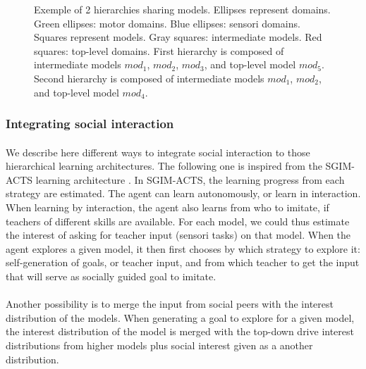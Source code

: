 \documentclass[12pt]{article}
\begin{document}
\begin{figure}[H]

				\caption{Exemple of 2 hierarchies sharing models.
				Ellipses represent domains. Green ellipses: motor domains. Blue ellipses: sensori domains. Squares represent models. Gray squares: intermediate models. Red squares: top-level domains.	First hierarchy is composed of intermediate models $mod_1$, $mod_2$, $mod_3$, and top-level model $mod_5$.  Second hierarchy is composed of intermediate models $mod_1$, $mod_2$, and top-level model $mod_4$.
				}
				\label{exemple}
			\end{figure}




		\subsubsection{Integrating social interaction}
			\label{sec:social}
			\paragraph{}
			We describe here different ways to integrate social interaction to those hierarchical learning architectures.				
			The following one is inspired from the SGIM-ACTS learning architecture \cite{nguyen2012}. 
			In SGIM-ACTS, the learning progress from each strategy are estimated. 
			The agent can learn autonomously, or learn in interaction.	
			When learning by interaction, the agent also learns from who to imitate, if teachers of different skills are available. 			
			For each model, we could thus estimate the interest of asking for teacher input (sensori tasks) on that model. 
			When the agent explores a given model, it then first chooses by which strategy to explore it: self-generation of goals, or teacher input, 
			and from which teacher to get the input that will serve as socially guided goal to imitate.

			\paragraph{}
			Another possibility is to merge the input from social peers with the interest distribution of the models.
			When generating a goal to explore for a given model, the interest distribution of the model is merged with the top-down drive interest distributions from higher models
			plus social interest given as a another distribution.
			
\end{document}
